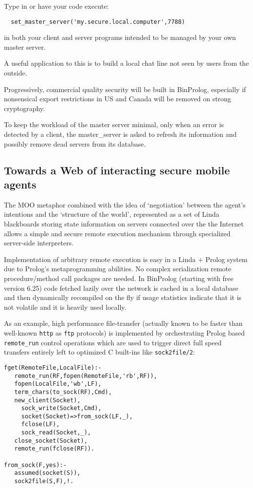 \documentclass{article}
\begin{document}
Type in or have your code execute:

\begin{verbatim}
  set_master_server('my.secure.local.computer',7788)
\end{verbatim}

in both your client and server programs intended to be
managed by your own master server.

A useful application to this is to build a local chat line
not seen by users from the outside.

Progressively, commercial quality security will be built in BinProlog,
especially if nonsensical export restrictions in US and Canada will be
removed on strong cryptography.

To keep the workload of the master server minimal, only when
an error is detected by a client, the master\_server is asked
to refresh its information and possibly remove dead servers
from its database.

\subsection{Towards a Web of interacting secure mobile agents}

The MOO metaphor combined with the idea of `negotiation' between
the agent's intentions and the `structure of the world', represented
as a set of Linda blackboards storing state information
on servers connected over the the Internet allows a simple and secure
remote execution mechanism through specialized server-side interpreters.

Implementation of arbitrary remote execution is easy
in a Linda + Prolog system due to Prolog's metaprogramming
abilities. No complex serialization remote procedure/method
call packages are needed. In BinProlog (starting with free version 6.25)
code fetched lazily over
the network is cached in a local database and then
dynamically recompiled on the fly if usage statistics
indicate that it is not volatile and it is heavily used locally.

As an example, high performance file-transfer (actually known to be faster than
well-known {\tt http} as {\tt ftp} protocols) is implemented by orchestrating
Prolog based {\tt remote\_run} control operations which are
used to trigger direct full speed transfers entirely left
to optimized C built-ins like {\tt sock2file/2}:

\begin{verbatim}
fget(RemoteFile,LocalFile):-
   remote_run(RF,fopen(RemoteFile,'rb',RF)),
   fopen(LocalFile,'wb',LF),
   term_chars(to_sock(RF),Cmd),
   new_client(Socket),
     sock_write(Socket,Cmd),
     socket(Socket)=>from_sock(LF,_),
     fclose(LF),
     sock_read(Socket,_),
   close_socket(Socket),
   remote_run(fclose(RF)).

from_sock(F,yes):-
   assumed(socket(S)),
   sock2file(S,F),!.
\end{verbatim}
\end{document}
